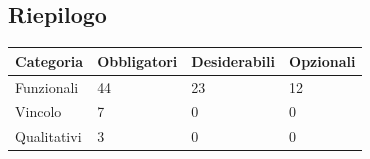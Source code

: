 \documentclass[12pt,a4paper,titlepage]{article}
\begin{document}
\subsection{Riepilogo}
\begin{center}
{\renewcommand\arraystretch{1.2}  %
	\small
	\begin{tabular}{|l|l|l|l|}
		\hline
		\textbf{Categoria} & \textbf{Obbligatori} & \textbf{Desiderabili} & \textbf{Opzionali}\\
		\hline
		Funzionali & 44 & 23 & 12 \\
		\hline
		Vincolo & 7 & 0 & 0\\
		\hline
		Qualitativi & 3 & 0 & 0\\
		\hline
	\end{tabular}
}	
\end{center}
\end{document}
